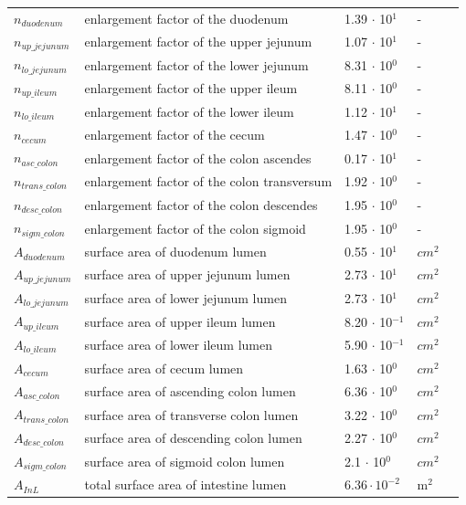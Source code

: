 \documentclass[preprint,12pt,authoryear]{elsarticle}
\begin{document}
\begin{longtable}{P{2cm}P{3.5cm}P{2cm}P{1cm}P{2.5cm}}
$n_{duodenum}$ & enlargement factor of the duodenum & 1.39 $\cdot$ 10$^1$ & - & \citep{willmann_2003} \\
$n_{up\_jejunum}$ & enlargement factor of the upper jejunum & 1.07 $\cdot$ 10$^1$ & - & \citep{willmann_2003} \\
$n_{lo\_jejunum}$ & enlargement factor of the lower jejunum & 8.31 $\cdot$ 10$^0$ & - & \citep{willmann_2003} \\
$n_{up\_ileum}$ & enlargement factor of the upper ileum & 8.11 $\cdot$ 10$^0$ & - & \citep{willmann_2003} \\
$n_{lo\_ileum}$ & enlargement factor of the lower ileum & 1.12 $\cdot$ 10$^1$ & - & \citep{willmann_2003} \\
$n_{cecum}$ & enlargement factor of the cecum & 1.47 $\cdot$ 10$^0$ & - & \citep{willmann_2003} \\
$n_{asc\_colon}$ & enlargement factor of the colon ascendes & 0.17 $\cdot$ 10$^{1}$ & - & \citep{willmann_2003} \\
$n_{trans\_colon}$ & enlargement factor of the colon transversum & 1.92 $\cdot$ 10$^0$ & - & \citep{willmann_2003} \\
$n_{desc\_colon}$ & enlargement factor of the colon descendes & 1.95 $\cdot$ 10$^0$ & - & \citep{willmann_2003} \\
$n_{sigm\_colon}$ & enlargement factor of the colon sigmoid & 1.95 $\cdot$ 10$^0$ & - & \citep{willmann_2003} \\

$A_{duodenum}$ & surface area of duodenum lumen & 0.55 $\cdot$ 10$^1$ & $cm^2$ & \citep{willmann_2003} \\
$A_{up\_jejunum}$ & surface area of upper jejunum lumen & 2.73 $\cdot$ 10$^1$ & $cm^2$ & \citep{willmann_2003} \\
$A_{lo\_jejunum}$ & surface area of lower jejunum lumen & 2.73 $\cdot$ 10$^1$ & $cm^2$ & \citep{willmann_2003} \\
$A_{up\_ileum}$ & surface area of upper ileum lumen & 8.20 $\cdot$ 10$^{-1}$ & $cm^2$ & \citep{willmann_2003} \\
$A_{lo\_ileum}$ & surface area of lower ileum lumen & 5.90 $\cdot$ 10$^{-1}$ & $cm^2$ & \citep{willmann_2003} \\
$A_{cecum}$ & surface area of cecum lumen & 1.63 $\cdot$ 10$^0$ & $cm^2$ & \citep{willmann_2003} \\
$A_{asc\_colon }$ & surface area of ascending colon  lumen & 6.36 $\cdot$ 10$^0$ & $cm^2$ & \citep{willmann_2003} \\
$A_{ trans\_colon}$ & surface area of transverse colon lumen & 3.22 $\cdot$ 10$^0$ & $cm^2$ & \citep{willmann_2003} \\
$A_{desc\_colon}$ & surface area of descending colon lumen & 2.27 $\cdot$ 10$^0$ & $cm^2$ & \citep{willmann_2003} \\
$A_{sigm\_colon}$ & surface area of sigmoid colon lumen & 2.1 $\cdot$ 10$^0$ & $cm^2$ & \citep{willmann_2003} \\
$A_{InL}$ & total surface area of intestine lumen & $6.36 \cdot 10^{-2}$ & $\text{m}^2$ & \citep{willmann_2003}  \\
\midrule\midrule


\end{longtable}
\end{document}
